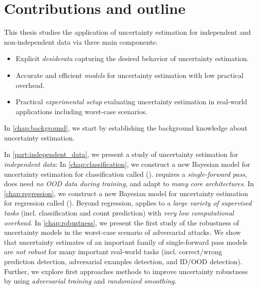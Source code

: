 \section{Contributions and outline}

This thesis studies the application of uncertainty estimation for independent and non-independent data via three main components:
\begin{itemize}
    \item Explicit \emph{desiderata} capturing the desired behavior of uncertainty estimation.
    \item Accurate and efficient \emph{models} for uncertainty estimation with low practical overhead.
    \item Practical \emph{experimental setup} evaluating uncertainty estimation in real-world applications including worst-case scenarios.
\end{itemize} 

In \cref{chap:background}, we start by establishing the background knowledge about uncertainty estimation.

In \cref{part:independent_data}, we present a study of uncertainty estimation for \emph{independent data}: 
In \cref{chap:classification}, we construct a new Bayesian model for uncertainty estimation for classification called \PostNet{} (\PostNetacro{}). \PostNetacro{} requires a \emph{single-forward pass}, does need \emph{no OOD data during training}, and adapt to \emph{many core architectures}.
In \cref{chap:regression}, we construct a new Bayesian model for uncertainty estimation for regression called \NatPN{} (\NatPNacro{}). Beyond regression, \NatPNacro{} applies to a \emph{large variety of supervised tasks} (incl. classification and count prediction) with \emph{very low computational overhead}.
In \cref{chap:robustness}, we present the first study of the robustness of uncertainty models in the worst-case scenario of adversarial attacks. We show that uncertainty estimates of an important family of single-forward pass models are \emph{not robust} for many important real-world tasks (incl. correct/wrong prediction detection, adversarial examples detection, and ID/OOD detection). Further, we explore first approaches methods to improve uncertainty robustness by using \emph{adversarial training} and \emph{randomized smoothing}. 

